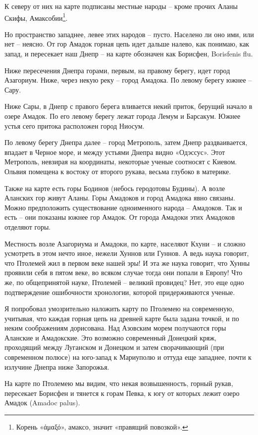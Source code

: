 К северу от них на карте подписаны местные народы – кроме прочих Аланы Скифы, Амаксобии\footnote{Корень «άμαξό», амаксо, значит «правящий повозкой».}.

Но пространство западнее, левее этих народов – пусто. Населено ли оно ими, или нет – неясно. От гор Амадок горная цепь идет дальше налево, как понимаю, как запад, и пересекает наш Днепр – на карте обозначен как Борисфен, Borisfenis flu.

Ниже пересечения Днепра горами, первым, на правому берегу, идет город Азагориум. Ниже, через некую реку – город Амадока. По левому берегу южнее – Сару.

Ниже Сары, в Днепр с правого берега вливается некий приток, берущий начало в озере Амадок. По его левому берегу лежат города Лемум и Барсакум. Южнее устья сего притока расположен город Ниосум.

По левому берегу Днепра далее – город Метрополь, затем Днепр раздваивается, впадает в Черное море, и между устьями Днепра видно «Одэссус». Этот Метрополь, невзирая на координаты, некоторые ученые соотносят с Киевом. Ольвия помещена к востоку от второго рукава, весьма глубоко в материке.

Также на карте есть горы Бодинов (небось геродотовы Будины). А возле Аланских гор живут Аланы. Горы Амадоков и город Амадока явно связаны. Можно предположить существование одноименного народа – Амадоков. Так и есть – они показаны южнее гор Амадок. От города Амадоки этих Амадоков отделяют горы.

Местность возле Азагориума и Амадоки, по карте, населяют Кхуни – и сложно усмотреть в этом нечто иное, нежели Хуннов или Гуннов. А ведь наука говорит, что Птолемей жил в первом веке нашей эры! И эта же наука говорит, что Хунны проявили себя в пятом веке, во всяком случае тогда они попали в Европу! Что же, по общепринятой науке, Птолемей – великий провидец? Нет, это еще одно подтверждение ошибочности хронологии, которой придерживаются ученые.

Я попробовал умозрительно наложить карту по Птолемею на современную, учитывая, что каждая горная цепь на древней карте была задана точкой, и по неким соображениям дорисована. Над Азовским морем получаются горы Аланские и Амадокские. Это возможно современный Донецкий кряж, проходящий между Луганском и Донецком и затем сворачивающий (при современном полюсе) на юго-запад к Мариуполю и оттуда еще западнее, почти к излучине Днепра ниже Запорожья.

На карте по Птолемею мы видим, что некая возвышенность, горный рукав, пересекает Борисфен и тянется к горам Певка, к югу от которых лежит озеро Амадок (Amadoc palus).

